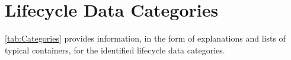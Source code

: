 %
%
\chapter{Lifecycle Data Categories} \label{bkm:categories}


\autoref{tab:Categories} provides information, in the form of explanations and lists of typical containers, for the identified lifecycle data categories.

